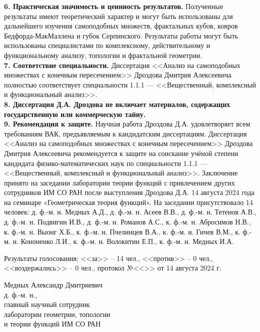 \documentclass[14pt, a4paper]{extarticle}
\begin{document}
{\bf 6. Практическая значимость и ценнность результатов.}
Полученные результаты имеют теоретический характер и могут быть использованы для дальнейшего изучения самоподобных множеств, фрактальных кубов, ковров Бедфорда-МакМаллена и губок Серпинского.
Результаты работы могут быть использованы специалистами по комплексному, действительному и функциональному анализу, топологии и фрактальной геометрии.
\\

{\bf 7. Соответствие специальности.}
Диссертация <<Анализ на самоподобных множествах с конечным пересечением>> Дроздова Дмитрия Алексеевича полностью соответствует специальности 1.1.1 --- <<Вещественный, комплексный и функциональный анализ>>.\\

{\bf 8. Диссертация Д.А. Дроздова не включает материалов, содержащих государственную или коммерческую тайну.}\\

{\bf 9. Рекомендация к защите.}
Научная работа Дроздова Д.А. удовлетворяет всем требованиям ВАК, предъявляемым к кандидатским диссертациям.
Диссертация <<Анализ на самоподобных множествах с конечным пересечением>> Дроздова Дмитрия Алексеевича рекомендуется к защите на соискание учёной степени кандидата физико-математических наук по специальности 1.1.1 --- <<Вещественный, комплексный и функциональный анализ>>.
Заключение принято на заседании лаборатории теории функций с привлечением других сотрудников ИМ СО РАН после выступления Дроздова Д.А. 14 августа 2024 года на семинаре  «Геометрическая теория функций». 
На заседании присутствовало 14 человек:
д. ф.-м. н. Медных А.Д., 
д. ф.-м. н. Асеев В.В., 
д. ф.-м. н. Тетенов А.В., 
д. ф.-м. н. Подвигин И.В., 
д. ф.-м. н. Романов А.С., 
к. ф.-м. н. Абросимов Н.В., 
к. ф.-м. н. Выонг Х.Б., 
к. ф.-м. н. Пчелинцев В.А., 
к. ф.-м. н. Гичев В.М., 
к. ф.-м. н. Кононенко Л.И., 
к. ф.-м. н. Волокитин Е.П., 
к. ф.-м. н. Медных И.А.

Результаты голосования: <<за>> -- 14 чел., <<против>> -- 0 чел., <<воздержались>> -- 0 чел., протокол №<<\underline{\hspace{1cm}}>> от 14 августа 2024 г. 

\vspace{1cm}

\noindent Медных Александр Дмитриевич\\
\noindent д. ф.-м. н.,\\
\noindent главный научный сотрудник\\
\noindent лаборатории геометрии, топологии\\
\noindent  и теории функций ИМ СО РАН\\

\end{document}
